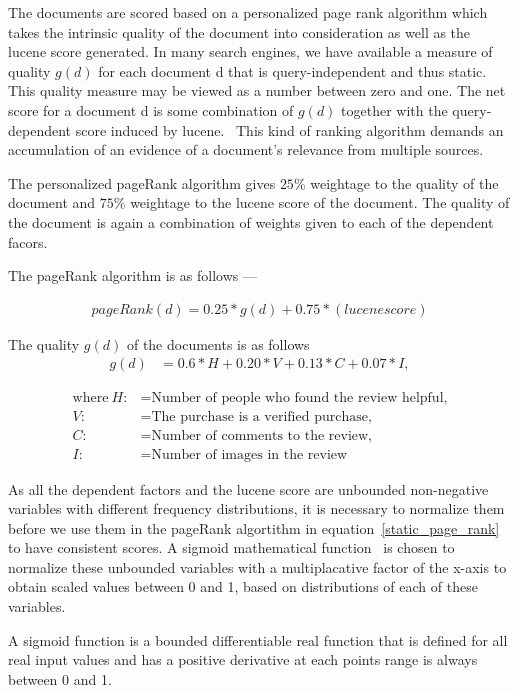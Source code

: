 \documentclass{article}
\begin{document}
The documents are scored based on a personalized page rank algorithm which takes the intrinsic quality of the document into consideration as well as the lucene score generated. In many search engines, we have available a measure of quality $g(d)$ for each document d that is query-independent and thus static. This quality measure may be viewed as a number between zero and one. The net score for a document d is some combination of $g(d)$ together with the query-dependent score induced by lucene.~\cite{manning2008introduction} This kind of ranking algorithm demands an accumulation of an evidence of a document's relevance from multiple sources. 

The personalized pageRank algorithm gives $25\%$ weightage to the quality of the document and $75\%$ weightage to the lucene score of the document. The quality of the document is again a combination of weights given to each of the dependent facors.  

The pageRank algorithm is as follows ---

\begin{align}
pageRank(d) = 0.25 * g(d) + 0.75 * (lucene score)
\end{align}

The quality $g(d)$ of the documents is as follows 
\begin{align}
  g(d) &= 0.6 * H  + 0.20 * V + 0.13 * C + 0.07 * I,
  \label{static_page_rank}
\end{align}

\begin{align*}
 \text{where}~H: &= \text{Number of people who found the review helpful,} \\
 V: &= \text{The purchase is a verified purchase,} \\
 C: &= \text{Number of comments to the review,} \\
 I: &= \text{Number of images in the review}
\end{align*}

As all the dependent factors and the lucene score are unbounded non-negative variables with different frequency distributions, it is necessary to normalize them before we use them in the pageRank algortithm in equation~\eqref{static_page_rank} to have consistent scores. A sigmoid mathematical function~\cite{wiki:sigmoid_function} is chosen to normalize these unbounded variables with a multiplacative factor of the x-axis to obtain scaled values between 0 and 1, based on distributions of each of these variables. 

A sigmoid function is a bounded differentiable real function that is defined for all real input values and has a positive derivative at each points range is always between 0 and 1.
\end{document}
